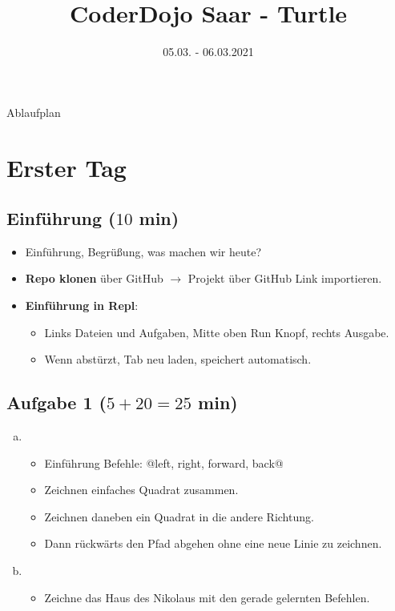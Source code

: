

\title{CoderDojo Saar - Turtle}
\date{05.03. - 06.03.2021}



	\maketitle
		
	\begin{center}
		{\large Ablaufplan}
	\end{center}	
	
	\tableofcontents
	
	
	\section{Erster Tag}
	\subsection{Einführung ($10$ min)} 
	\begin{itemize}
		\item
		Einführung, Begrüßung, was machen wir heute?
		
		\item 
		\textbf{Repo klonen} über GitHub $\to$ Projekt über GitHub Link importieren.
		
		\item
		\textbf{Einführung in Repl}:
		\begin{itemize}
			\item 
			Links Dateien und Aufgaben, Mitte oben Run Knopf, rechts Ausgabe.
			
			\item
			Wenn abstürzt, Tab neu laden, speichert automatisch.
		\end{itemize}	
	\end{itemize}


	\subsection{Aufgabe 1 ($5+20=25$ min)}
	\begin{enumerate}[(a)]
		\item 
		\begin{itemize}
			\item 
			Einführung Befehle: @left, right, forward, back@
			\item
			Zeichnen einfaches Quadrat zusammen.
			\item
			Zeichnen daneben ein Quadrat in die andere Richtung.
			\item
			Dann rückwärts den Pfad abgehen ohne eine neue Linie zu zeichnen.
		\end{itemize}
		
		\item
		\begin{itemize}
			\item 
			Zeichne das Haus des Nikolaus mit den gerade gelernten Befehlen.
		\end{itemize}
	\end{enumerate}


